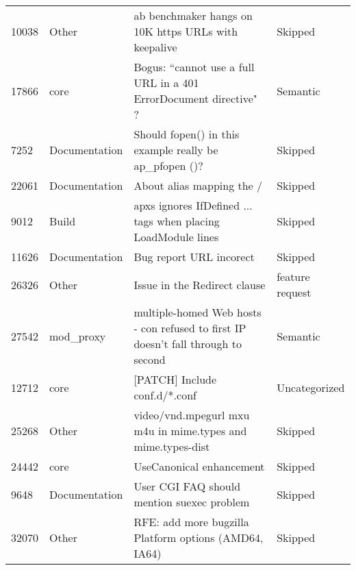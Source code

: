 \begin{longtable}[c]{p{1cm}p{3cm}p{6cm}p{4cm}}
10038  & Other              & ab benchmaker hangs on 10K https URLs with keepalive                                                           & Skipped           \\
17866  & core               & Bogus: ``cannot use a full URL in a 401 ErrorDocument directive" ?                                              & Semantic          \\
7252   & Documentation      & Should fopen() in this example really be ap\_pfopen ()?                                                        & Skipped           \\
22061  & Documentation      & About alias mapping the /                                                                                      & Skipped           \\
9012   & Build              & apxs ignores IfDefined ... tags when placing LoadModule lines                             & Skipped           \\
11626  & Documentation      & Bug report URL incorect                                                                                        & Skipped           \\
26326  & Other              & Issue in the Redirect clause                                                                                   & feature request   \\
27542  & mod\_proxy         & multiple-homed Web hosts - con refused to first IP doesn't fall through to second                              & Semantic          \\
12712  & core               & {[}PATCH{]} Include conf.d/*.conf                                                                              & Uncategorized     \\
25268  & Other              & video/vnd.mpegurl mxu m4u in mime.types and mime.types-dist                                                    & Skipped           \\
24442  & core               & UseCanonical enhancement                                                                                       & Skipped           \\
9648   & Documentation      & User CGI FAQ should mention suexec problem                                                                     & Skipped           \\
32070  & Other              & RFE: add more bugzilla Platform options (AMD64, IA64)                                                          & Skipped           \\

\end{longtable}

